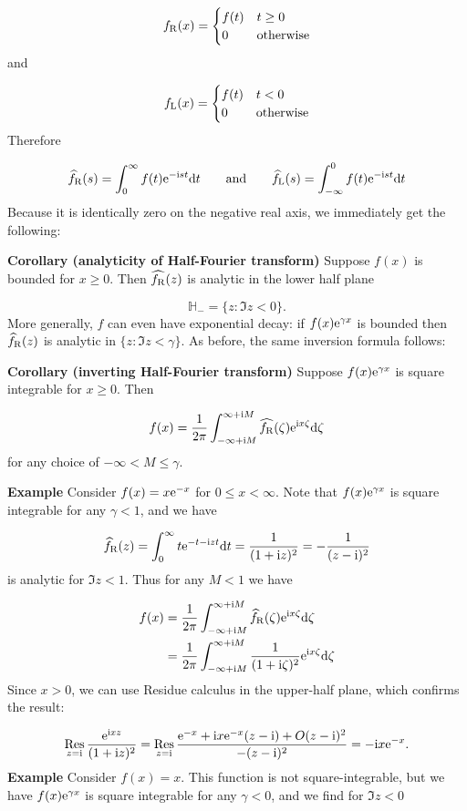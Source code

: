 \documentclass[12pt,a4paper]{article}
\def\qqand{\qquad\hbox{and}\qquad}
\def\D{ {\rm d} }
\def\I{ {\rm i} }
\def\E{ {\rm e} }
\def\H{ {\mathbb H} }
\def\fR{ f_{\rm R} }
\def\fL{ f_{\rm L} }
\def\Res_#1{\underset{#1}{\rm Res}\,}
\def\dt{\D t}
\begin{document}
\[
f_{\rm R}(x) = \begin{cases}f(t) & t \geq 0 \\ 0 & \hbox{otherwise} \end{cases}
\]
and

\[
f_{\rm L}(x) = \begin{cases}f(t) & t < 0 \\ 0 & \hbox{otherwise} \end{cases}
\]
Therefore

\[
\widehat\fR(s) = \int_0^\infty f(t) \E^{-\I s t} \dt \qqand \widehat\fL(s) = \int_{-\infty}^0 f(t) \E^{-\I s t} \dt
\]
Because it is identically zero on the negative real axis, we immediately get the following:

\textbf{Corollary (analyticity of Half-Fourier transform)}  Suppose $f(x)$ is bounded for $x \geq 0$. Then $\widehat{\fR}(z)$ is analytic in the lower half plane

\[
\H_- = \{ z : \Im z < 0 \}.
\]
More generally, $f$ can even have exponential decay: if $f(x) \E^{\gamma x}$ is bounded then $\widehat\fR(z)$ is analytic in $\{z : \Im z < \gamma \}$.  As before, the same inversion formula follows:

\textbf{Corollary  (inverting Half-Fourier transform)}  Suppose  $f(x) \E^{\gamma x}$ is square integrable for $x \geq 0$. Then

\[
f(x) = {1 \over 2 \pi} \int_{-\infty + \I M}^{\infty + \I M} \widehat{\fR}(\zeta) \E^{\I x \zeta} \D \zeta
\]
for any choice of $-\infty < M \leq \gamma$.

\textbf{Example} Consider $f(x)  = x \E^{-x}$ for $0 \leq x < \infty$.  Note that $f(x) \E^{\gamma x}$ is square integrable for any $\gamma < 1$, and we have

\[
\widehat\fR(z) = \int_0^\infty t \E^{-t -\I z t} \dt = {1 \over (1+\I z)^2} = -{1 \over (z - \I)^2}
\]
is analytic for $\Im z < 1$. Thus for any $M < 1$ we have


\begin{align*}
f(x) &= {1 \over 2 \pi} \int_{-\infty+\I M}^{\infty +\I M}\widehat\fR(\zeta) \E^{\I x \zeta}\D \zeta \\
     &={1 \over 2 \pi} \int_{-\infty+\I M}^{\infty +\I M}{1 \over (1+\I \zeta)^2} \E^{\I x \zeta}\D \zeta
\end{align*}
Since $x > 0$, we can use Residue calculus in the upper-half plane, which confirms the result:

\[
\Res_{z = \I} {\E^{\I x z} \over  (1+\I z)^2}  = \Res_{z = \I} {\E^{- x} + \I x \E^{-x} (z - \I) + O(z-\I)^2 \over  -(z-\I)^2}  = -\I x \E^{-x}.
\]
\textbf{Example} Consider $f(x) = x$.  This function is not square-integrable, but we have $f(x) \E^{\gamma x}$ is square integrable for any $\gamma < 0$, and we find for $\Im z < 0$
\end{document}
